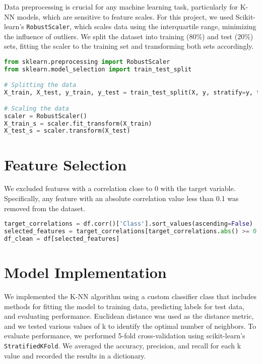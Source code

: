 \documentclass{article}
\begin{document}
Data preprocessing is crucial for any machine learning task, particularly for K-NN models, which are sensitive to feature scales. For this project, we used Scikit-learn’s \texttt{RobustScaler}, which scales data using the interquartile range, minimizing the influence of outliers. We split the dataset into training (80\%) and test (20\%) sets, fitting the scaler to the training set and transforming both sets accordingly.

\begin{lstlisting}[language=Python, caption=Data Preprocessing]
from sklearn.preprocessing import RobustScaler
from sklearn.model_selection import train_test_split

# Splitting the data
X_train, X_test, y_train, y_test = train_test_split(X, y, stratify=y, test_size=0.2, random_state=42)

# Scaling the data
scaler = RobustScaler()
X_train_s = scaler.fit_transform(X_train)
X_test_s = scaler.transform(X_test)
\end{lstlisting}

\section{Feature Selection}

We excluded features with a correlation close to 0 with the target variable. Specifically, any feature with an absolute correlation value less than 0.1 was removed from the dataset.

\begin{lstlisting}[language=Python, caption=Feature Selection]
target_correlations = df.corr()['Class'].sort_values(ascending=False)
selected_features = target_correlations[target_correlations.abs() >= 0.1].index.tolist()
df_clean = df[selected_features]
\end{lstlisting}

\section{Model Implementation}

We implemented the K-NN algorithm using a custom classifier class that includes methods for fitting the model to training data, predicting labels for test data, and evaluating performance. Euclidean distance was used as the distance metric, and we tested various values of k to identify the optimal number of neighbors. To evaluate performance, we performed 5-fold cross-validation using scikit-learn’s \texttt{StratifiedKFold}. We averaged the accuracy, precision, and recall for each k value and recorded the results in a dictionary.
\end{document}
